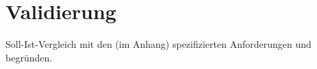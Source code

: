 \section{Validierung}

Soll-Ist-Vergleich mit den (im Anhang) spezifizierten Anforderungen und begründen.


